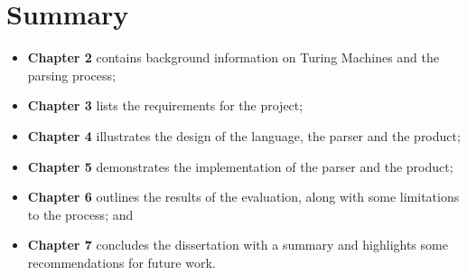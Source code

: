 \section{Summary}
\begin{itemize}
    \item \textbf{Chapter 2} contains background information on Turing Machines and the parsing process;
    \item \textbf{Chapter 3} lists the requirements for the project;
    \item \textbf{Chapter 4} illustrates the design of the language, the parser and the product;
    \item \textbf{Chapter 5} demonstrates the implementation of the parser and the product;
    \item \textbf{Chapter 6} outlines the results of the evaluation, along with some limitations to the process; and
    \item \textbf{Chapter 7} concludes the dissertation with a summary and highlights some recommendations for future work.
\end{itemize}







